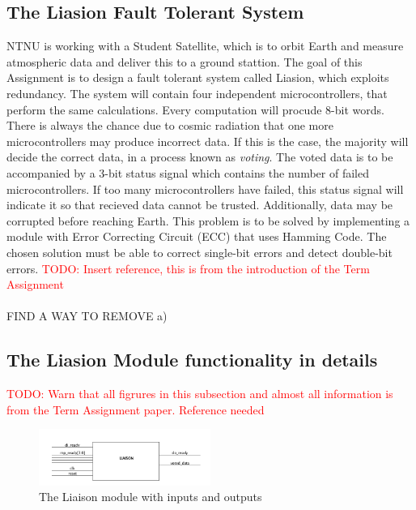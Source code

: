 \documentclass[a4paper]{IEEEtran}
\newcommand\TODO[1]{\textcolor{red}{TODO:#1}}
\newcommand\todo[1]{\TODO{#1}}
\begin{document}
\subsection{The Liasion Fault Tolerant System}
NTNU is working with a Student Satellite, which is to orbit Earth and measure atmospheric data and deliver this to a ground stattion. The goal of this Assignment is to design a fault tolerant system called Liasion, which exploits redundancy. The system will contain four independent microcontrollers, that perform the same calculations. Every computation will procude 8-bit words. There is always the chance due to cosmic radiation that one more microcontrollers may produce incorrect data. If this is the case, the majority will decide the correct data, in a process known as \textit{voting}. The voted data is to be accompanied by a 3-bit status signal which contains the number of failed microcontrollers. If too many microcontrollers have failed, this status signal will indicate it so that recieved data cannot be trusted. Additionally, data may be corrupted before reaching Earth. This problem is to be solved by implementing a module with Error Correcting Circuit (ECC) that uses Hamming Code. The chosen solution must be able to correct single-bit errors and detect double-bit errors.
\break 
\todo{ Insert reference, this is from the introduction of the Term Assignment}
\paragraph{}
FIND A WAY TO REMOVE a)


\subsection{The Liasion Module functionality in details}

\todo{ Warn that all figrures in this subsection and almost all information is from the Term Assignment paper. Reference needed}

\begin{figure}[h!]
  \centering
      \includegraphics[width=0.5\textwidth]{Figures/ProjectDescription/LiaisonBlackBox}
  \caption{The Liaison module with inputs and outputs}
  \label{fig:LiaisonBlackBox}
\end{figure}
\end{document}
